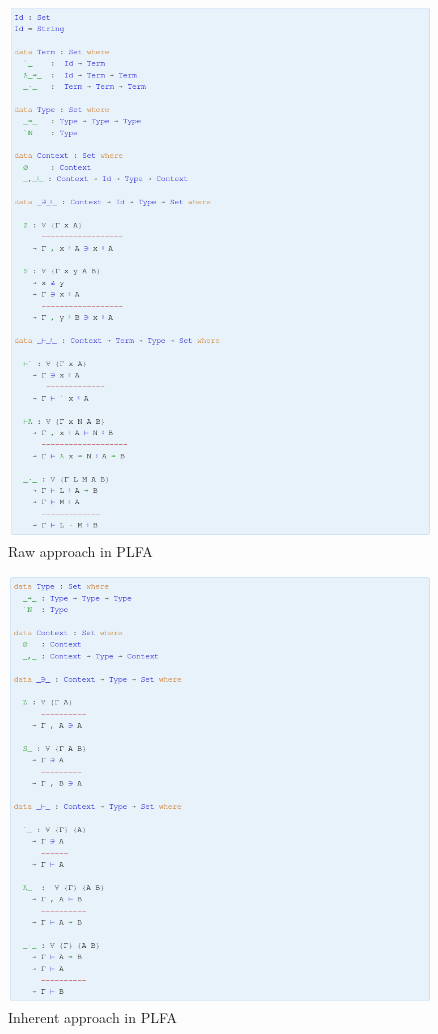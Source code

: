 \documentclass[preprint,authoryear]{elsarticle}
\begin{document}
\begin{figure}[p]
  \includegraphics[width=\textwidth]{figures/raw.png}
  \caption{Raw approach in PLFA}
  \label{fig:raw}
\end{figure}  

\begin{figure}[t]
  \includegraphics[width=\textwidth]{figures/inherent.png}
  \caption{Inherent approach in PLFA}
  \label{fig:inherent}
\end{figure}  
\end{document}
